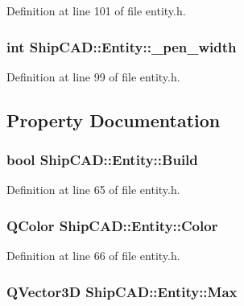 Definition at line 101 of file entity.\-h.

\hypertarget{classShipCAD_1_1Entity_a5a9892a0d84d2cfdcd3a5dabf662a595}{
\subsubsection[{\-\_\-pen\-\_\-width}]{\setlength{\rightskip}{0pt plus 5cm}int Ship\-C\-A\-D\-::\-Entity\-::\-\_\-pen\-\_\-width\hspace{0.3cm}{\ttfamily [protected]}}}\label{classShipCAD_1_1Entity_a5a9892a0d84d2cfdcd3a5dabf662a595}


Definition at line 99 of file entity.\-h.



\subsection{Property Documentation}
\hypertarget{classShipCAD_1_1Entity_a7518cde7c6a7c576827efd3d65c732e4}{
\subsubsection[{Build}]{\setlength{\rightskip}{0pt plus 5cm}bool Ship\-C\-A\-D\-::\-Entity\-::\-Build\hspace{0.3cm}{\ttfamily [read]}}}\label{classShipCAD_1_1Entity_a7518cde7c6a7c576827efd3d65c732e4}


Definition at line 65 of file entity.\-h.

\hypertarget{classShipCAD_1_1Entity_a117b8362d17e9ef352555a85a6f015ff}{
\subsubsection[{Color}]{\setlength{\rightskip}{0pt plus 5cm}Q\-Color Ship\-C\-A\-D\-::\-Entity\-::\-Color}}\label{classShipCAD_1_1Entity_a117b8362d17e9ef352555a85a6f015ff}


Definition at line 66 of file entity.\-h.

\hypertarget{classShipCAD_1_1Entity_a1ce317d1da352757209465baebce15f8}{
\subsubsection[{Max}]{\setlength{\rightskip}{0pt plus 5cm}Q\-Vector3\-D Ship\-C\-A\-D\-::\-Entity\-::\-Max\hspace{0.3cm}{\ttfamily [read]}}}\label{classShipCAD_1_1Entity_a1ce317d1da352757209465baebce15f8}


